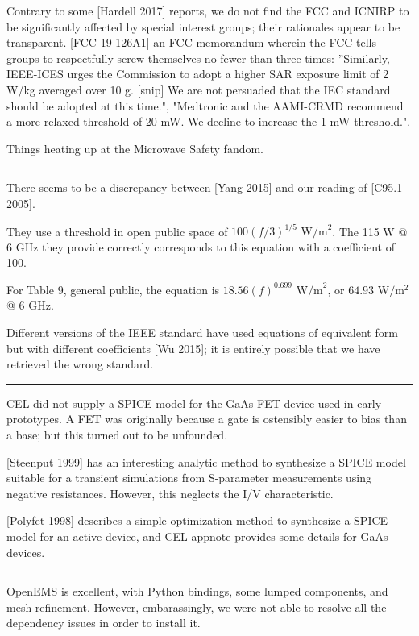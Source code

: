 \documentclass[paper.tex]{subfiles}
\begin{document}
Contrary to some [Hardell 2017] reports, we do not find the FCC and ICNIRP to be significantly affected by special interest groups; their rationales appear to be transparent.  [FCC-19-126A1] an FCC memorandum wherein the FCC tells groups to respectfully screw themselves no fewer than three times: ''Similarly, IEEE-ICES urges the Commission to
adopt a higher SAR exposure limit of 2 W/kg averaged over 10 g. [snip] We are not persuaded that the IEC standard should be adopted at this time.", "Medtronic and the AAMI-CRMD recommend a more relaxed threshold of 20 mW. We decline to increase the 1-mW threshold.". 

Things heating up at the Microwave Safety fandom.


\clearpage
\rule{\linewidth}{0.2pt}

There seems to be a discrepancy between [Yang 2015] and our reading of [C95.1-2005].

They use a threshold in open public space of $100(f/3)^{1/5} \text{ W/m}^2$. The 115 W @ 6 GHz they provide correctly corresponds to this equation with a coefficient of 100.

For Table 9, general public, the equation is $18.56 (f)^{0.699} \text{ W/m}^2$, or $64.93 \text{ W}/\text{m}^2$ @ 6 GHz. 

Different versions of the IEEE standard have used equations of equivalent form but with different coefficients [Wu 2015]; it is entirely possible that we have retrieved the wrong standard.

\rule{\linewidth}{0.2pt}

CEL did not supply a SPICE model for the GaAs FET device used in early prototypes. A FET was originally because a gate is ostensibly easier to bias than a base; but this turned out to be unfounded.

[Steenput 1999] has an interesting analytic method to synthesize a SPICE model suitable for a transient simulations from S-parameter measurements using negative resistances. However, this neglects the I/V characteristic. 

[Polyfet 1998] describes a simple optimization method to synthesize a SPICE model for an active device, and CEL appnote provides some details for GaAs devices.



\rule{\linewidth}{0.2pt}

OpenEMS is excellent, with Python bindings, some lumped components, and mesh refinement. However, embarassingly, we were not able to resolve all the dependency issues in order to install it.
\end{document}
